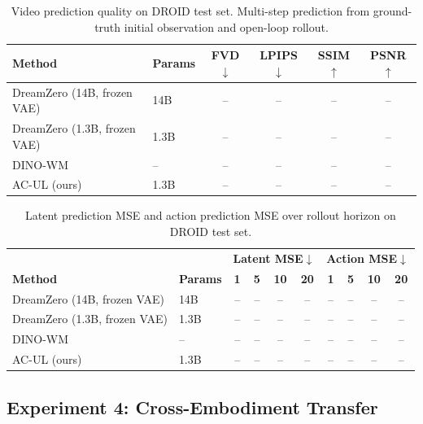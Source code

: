\documentclass{article}
\begin{document}
\begin{table}[t]
\centering
\caption{Video prediction quality on DROID test set. Multi-step prediction from ground-truth initial observation and open-loop rollout.}
\label{tab:video_pred}
\begin{tabular}{llcccc}
\toprule
\textbf{Method} & \textbf{Params} & \textbf{FVD$\downarrow$} & \textbf{LPIPS$\downarrow$} & \textbf{SSIM$\uparrow$} & \textbf{PSNR$\uparrow$} \\
\midrule
DreamZero (14B, frozen VAE)   & 14B  & -- & -- & -- & -- \\
DreamZero (1.3B, frozen VAE)  & 1.3B & -- & -- & -- & -- \\
DINO-WM                       & --   & -- & -- & -- & -- \\
\midrule
AC-UL (ours)                  & 1.3B & -- & -- & -- & -- \\
\bottomrule
\end{tabular}
\end{table}

\begin{table}[t]
\centering
\caption{Latent prediction MSE and action prediction MSE over rollout horizon on DROID test set.}
\label{tab:latent_rollout}
\begin{tabular}{llcccc|cccc}
\toprule
& & \multicolumn{4}{c|}{\textbf{Latent MSE$\downarrow$}} & \multicolumn{4}{c}{\textbf{Action MSE$\downarrow$}} \\
\textbf{Method} & \textbf{Params} & \textbf{1} & \textbf{5} & \textbf{10} & \textbf{20} & \textbf{1} & \textbf{5} & \textbf{10} & \textbf{20} \\
\midrule
DreamZero (14B, frozen VAE)   & 14B  & -- & -- & -- & -- & -- & -- & -- & -- \\
DreamZero (1.3B, frozen VAE)  & 1.3B & -- & -- & -- & -- & -- & -- & -- & -- \\
DINO-WM                       & --   & -- & -- & -- & -- & -- & -- & -- & -- \\
\midrule
AC-UL (ours)                  & 1.3B & -- & -- & -- & -- & -- & -- & -- & -- \\
\bottomrule
\end{tabular}
\end{table}

\subsection{Experiment 4: Cross-Embodiment Transfer}
\label{sec:exp_transfer}
\end{document}
